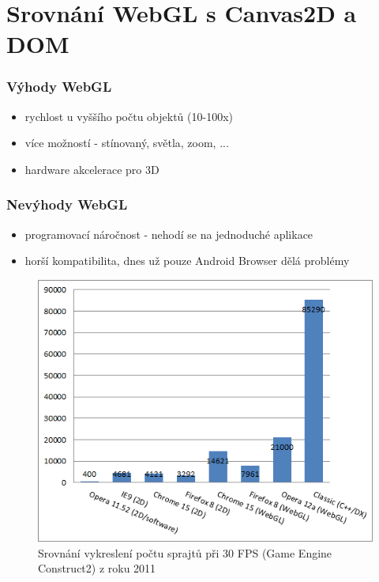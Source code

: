 \documentclass[12pt,a4paper,titlepage,final]{report}
\begin{document}
\section{Srovnání WebGL s Canvas2D a DOM}

\subsubsection{Výhody WebGL}
\begin{itemize}
	\item rychlost u vyššího počtu objektů (10-100x)
	\item více možností - stínovaný, světla, zoom, ...	
	\item hardware akcelerace pro 3D
\end{itemize}
\subsubsection{Nevýhody WebGL}
\begin{itemize}
	\item programovací náročnost - nehodí se na jednoduché aplikace
	\item horší kompatibilita, dnes už pouze Android Browser dělá problémy
\end{itemize}



\begin{figure}[ht]
\begin{center}

\includegraphics[width=12cm]{images/allperf-graph.png}
\caption{Srovnání vykreslení počtu sprajtů při 30 FPS (Game Engine Construct2) z roku 2011}
\label{fig:theory}
\end{center}
\end{figure}
\end{document}
